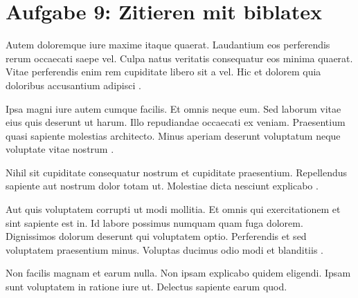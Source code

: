 \newpage
\section{Aufgabe 9: Zitieren mit biblatex}
Autem doloremque iure maxime itaque quaerat. Laudantium eos perferendis
rerum occaecati saepe vel. Culpa natus veritatis consequatur eos minima
quaerat.  Vitae perferendis enim rem cupiditate libero sit a vel. Hic et
dolorem quia doloribus accusantium adipisci \cite{landau1945}.

Ipsa magni iure autem cumque facilis. Et omnis neque eum. Sed laborum vitae
eius quis deserunt ut harum. Illo repudiandae occaecati ex veniam.
Praesentium quasi sapiente molestias architecto. Minus aperiam deserunt
voluptatum neque voluptate vitae nostrum \cite{chust2006}.

Nihil sit cupiditate consequatur nostrum et cupiditate praesentium.
Repellendus sapiente aut nostrum dolor totam ut. Molestiae dicta nesciunt
explicabo \cite{strang1968}.

Aut quis voluptatem corrupti ut modi mollitia. Et omnis qui exercitationem
et sint sapiente est in. Id labore possimus numquam quam fuga dolorem.
Dignissimos dolorum deserunt qui voluptatem optio. Perferendis et sed
voluptatem praesentium minus. Voluptas ducimus odio modi et
blanditiis \cite{lautenbach2018}.

Non facilis magnam et earum nulla. Non ipsam explicabo quidem eligendi.
Ipsam sunt voluptatem in ratione iure ut. Delectus sapiente earum quod.
